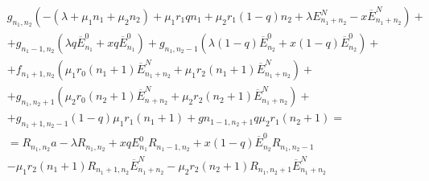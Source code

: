  \begin{equation}\label{sistemG}
	\begin{split}
		&g_{n_{1}, n_{2}}(-(\lambda +\mu_{1} n_{1}+\mu_{2} n_{2})+\mu_{1} r_{1} q n_{1}+ \mu_{2} r_{1} (1-q) n_{2} + \lambda E_{n_{1} + n_{2}}^{N} - x\overline{E}_{n_{1} + n_{2}}^{N})+\\
		&+g_{n_{1}-1, n_{2}}(\lambda q \overline{E}_{n_{1}}^{0}+xq\overline{E}_{n_{1}}^{0})+g_{n_{1}, n_{2}-1}(\lambda (1-q) \overline{E}_{n_{2}}^{0}+x(1-q)\overline{E}_{n_{2}}^{0})+\\
		&+f_{n_{1}+1, n_{2}}(\mu_{1} r_{0}(n_{1}+1)\overline{E}_{n_{1} + n_{2}}^{N} + \mu_{1} r_{2}(n_{1}+1)\overline{E}_{n_{1} + n_{2}}^{N})+\\
		&+g_{n_{1}, n_{2}+1}(\mu_{2} r_{0}(n_{2}+1)\overline{E}_{n_{} + n_{2}}^{N} + \mu_{2} r_{2}(n_{2}+1)\overline{E}_{n_{1} + n_{2}}^{N})+\\
		&+g_{n_{1}+1, n_{2}-1}(1-q)\mu_{1} r_{1} (n_{1}+1)+g{n_{1-1, n_{2}+1}}q\mu_{2}r_{1}(n_{2}+1)=\\
		&=R_{n_{1}, n_{2}}a-\lambda R_{n_{1}, n_{2}} +x q E_{n_{1}}^{0} R_{n_{1}-1, n_{2}}+x (1-q) \overline{E}_{n_{2}}^{0} R_{n_{1}, n_{2}-1}\\
		&-\mu_{1}r_{2}(n_{1}+1)R_{n_{1}+1, n_{2}}\overline{E}_{n_{1} + n_{2}}^{N}-\mu_{2}r_{2}(n_{2}+1)R_{n_{1}, n_{2}+1}\overline{E}_{n_{1} + n_{2}}^{N}
	\end{split}
\end{equation}

